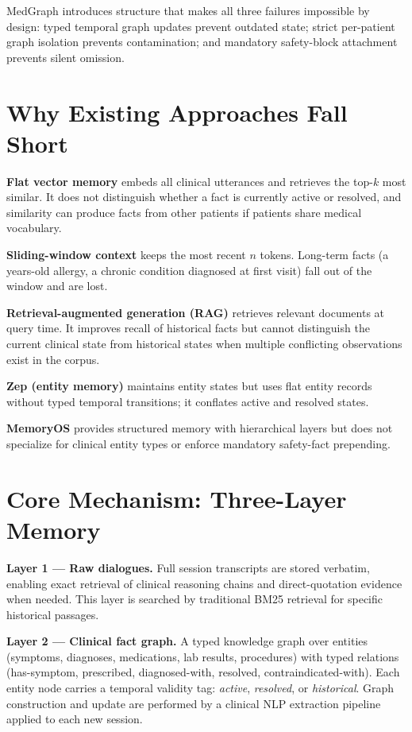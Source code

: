 \documentclass[10pt,twocolumn]{article}
\begin{document}
MedGraph introduces structure that makes all three failures impossible
by design: typed temporal graph updates prevent outdated state; strict
per-patient graph isolation prevents contamination; and mandatory
safety-block attachment prevents silent omission.

\section{Why Existing Approaches Fall Short}

\textbf{Flat vector memory} embeds all clinical utterances and
retrieves the top-$k$ most similar. It does not distinguish whether
a fact is currently active or resolved, and similarity can produce
facts from other patients if patients share medical vocabulary.

\textbf{Sliding-window context} keeps the most recent $n$ tokens.
Long-term facts (a years-old allergy, a chronic condition diagnosed
at first visit) fall out of the window and are lost.

\textbf{Retrieval-augmented generation (RAG)} retrieves relevant
documents at query time. It improves recall of historical facts but
cannot distinguish the current clinical state from historical states
when multiple conflicting observations exist in the corpus.

\textbf{Zep (entity memory)} maintains entity states but uses
flat entity records without typed temporal transitions; it conflates
active and resolved states.

\textbf{MemoryOS} provides structured memory with hierarchical
layers but does not specialize for clinical entity types or enforce
mandatory safety-fact prepending.

\section{Core Mechanism: Three-Layer Memory}

\textbf{Layer 1 --- Raw dialogues.}
Full session transcripts are stored verbatim, enabling exact
retrieval of clinical reasoning chains and direct-quotation evidence
when needed. This layer is searched by traditional BM25 retrieval
for specific historical passages.

\textbf{Layer 2 --- Clinical fact graph.}
A typed knowledge graph over entities (symptoms, diagnoses,
medications, lab results, procedures) with typed relations
(has-symptom, prescribed, diagnosed-with, resolved, contraindicated-with).
Each entity node carries a temporal validity tag: \textit{active},
\textit{resolved}, or \textit{historical}. Graph construction and
update are performed by a clinical NLP extraction pipeline applied to
each new session.
\end{document}
